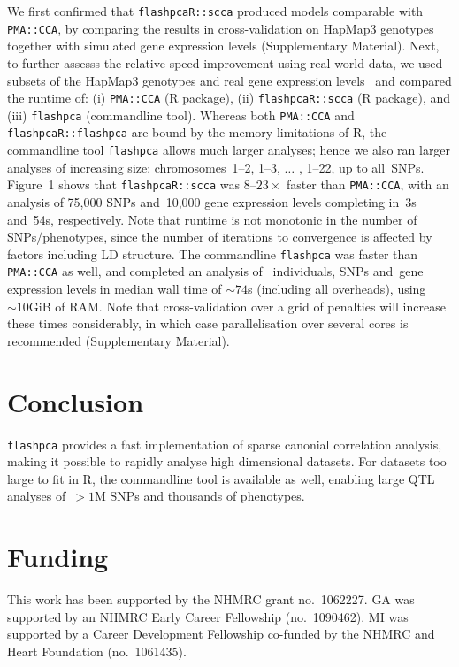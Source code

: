 \documentclass{bioinfo}
\begin{document}
We first confirmed that \texttt{flashpcaR::scca} produced models comparable
with \texttt{PMA::CCA}, by comparing the results in cross-validation on HapMap3
genotypes together with simulated gene expression levels (Supplementary
Material).  Next, to further assesss the relative speed improvement using
real-world data, we used subsets of the HapMap3 genotypes and real gene
expression levels~\citep{Stranger2012} and compared the runtime of: (i)
\texttt{PMA::CCA} (\textsf{R} package), (ii) \texttt{flashpcaR::scca}
(\textsf{R} package), and (iii) \texttt{flashpca} (commandline tool).
Whereas both \texttt{PMA::CCA} and \texttt{flashpcaR::flashpca} are bound by
the memory limitations of \textsf{R}, the commandline tool \texttt{flashpca}
allows much larger analyses; hence we also ran larger analyses of increasing
size: chromosomes~1--2, 1--3, $\hdots$ , 1--22, up to all~\nsnps SNPs.
Figure~1\vphantom{\ref{fig:01}} shows that \texttt{flashpcaR::scca} was
$8\text{--}23\times$ faster than \texttt{PMA::CCA}, with an analysis of
75,000 SNPs and~10,000 gene expression levels completing in~3s and~54s,
respectively.  Note that runtime is not monotonic in the number of
SNPs/phenotypes, since the number of iterations to convergence is affected
by factors including LD structure.  The commandline \texttt{flashpca} was
faster than \texttt{PMA::CCA} as well, and completed an analysis of~\nindiv
individuals, \nsnps SNPs and~\ngenes gene expression levels in median
wall time of ${\sim}74$s (including all overheads), using~${\sim}10$GiB
of RAM. Note that cross-validation over a grid of penalties will increase
these times considerably, in which case parallelisation over several cores
is recommended (Supplementary Material).\vspace*{-12pt}

\section{Conclusion}

\texttt{flashpca} provides a fast implementation of sparse canonial correlation
analysis, making it possible to rapidly analyse high dimensional datasets.
For datasets too large to fit in \textsf{R}, the commandline tool is
available as well, enabling large QTL analyses of~${>}1$M SNPs and thousands
of phenotypes.\vspace*{-12pt}

\section*{Funding}

This work has been supported by the NHMRC grant no.~1062227. GA was supported
by an NHMRC Early Career Fellowship (no.~1090462). MI was supported by a
Career Development Fellowship co-funded by the NHMRC and Heart Foundation
(no.~1061435).\vspace*{-12pt}




%
%
%
%
%
%
%
\end{document}
